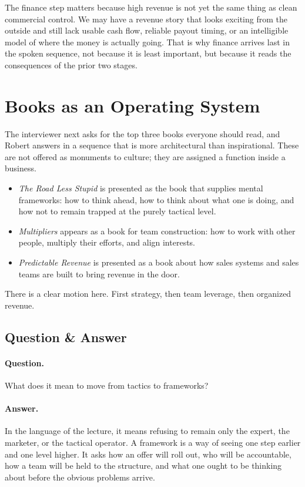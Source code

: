 The finance step matters because high revenue is not yet the same thing as clean commercial control. We may have a revenue story that looks exciting from the outside and still lack usable cash flow, reliable payout timing, or an intelligible model of where the money is actually going. That is why finance arrives last in the spoken sequence, not because it is least important, but because it reads the consequences of the prior two stages.

\section{Books as an Operating System}

The interviewer next asks for the top three books everyone should read, and Robert answers in a sequence that is more architectural than inspirational. These are not offered as monuments to culture; they are assigned a function inside a business.

\begin{itemize}
\item \emph{The Road Less Stupid} is presented as the book that supplies mental frameworks: how to think ahead, how to think about what one is doing, and how not to remain trapped at the purely tactical level.
\item \emph{Multipliers} appears as a book for team construction: how to work with other people, multiply their efforts, and align interests.
\item \emph{Predictable Revenue} is presented as a book about how sales systems and sales teams are built to bring revenue in the door.
\end{itemize}

There is a clear motion here. First strategy, then team leverage, then organized revenue.

\subsection{Question \& Answer}

\paragraph{Question.}
What does it mean to move from tactics to frameworks?

\paragraph{Answer.}
In the language of the lecture, it means refusing to remain only the expert, the marketer, or the tactical operator. A framework is a way of seeing one step earlier and one level higher. It asks how an offer will roll out, who will be accountable, how a team will be held to the structure, and what one ought to be thinking about before the obvious problems arrive.

